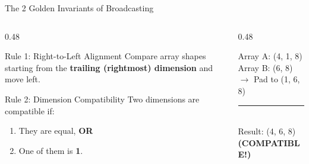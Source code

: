 \begin{frame}{The 2 Golden Invariants of Broadcasting}
  \begin{columns}[T,onlytextwidth]
    \begin{column}{0.48\textwidth}
      \begin{ConceptBox}{Rule 1: Right-to-Left Alignment}
        \scriptsize Compare array shapes starting from the \textbf{trailing (rightmost) dimension} and move left.
      \end{ConceptBox}
      \vspace{0.10cm}
      \begin{ConceptBox}{Rule 2: Dimension Compatibility}
        \scriptsize Two dimensions are compatible if:
        \begin{enumerate}\setlength{\itemsep}{0.04cm}
          \item They are equal, \textbf{OR}
          \item One of them is \textbf{1}.
        \end{enumerate}
      \end{ConceptBox}
    \end{column}
    \begin{column}{0.48\textwidth}
      \begin{tcolorbox}[enhanced,arc=1.2mm,boxrule=.4pt,colback=UpGradNight,colframe=AWSSquid,title={\bfseries\scriptsize Trailing Dimension Alignment},coltitle=white]
        \ttfamily\scriptsize\color{UpGradMist}
        Array A:  (4,  1,  8)\\[2pt]
        Array B:      (6,  8)  $\to$ Pad to (1, 6, 8)\\[2pt]
        \textcolor{UpGradRed}{\rule{4.5cm}{0.4pt}}\\[2pt]
        Result:   (4,  6,  8)  \color{AWSEmerald}\bfseries(COMPATIBLE!)
      \end{tcolorbox}
    \end{column}
  \end{columns}
  \vspace{0.15cm}
\end{frame}

